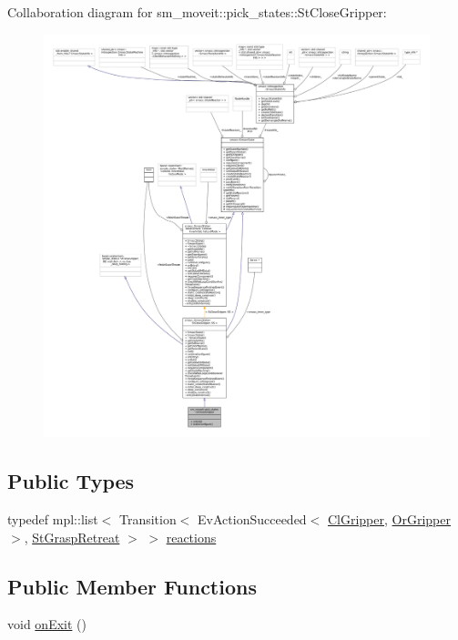 Collaboration diagram for sm\+\_\+moveit\+:\+:pick\+\_\+states\+:\+:St\+Close\+Gripper\+:
\nopagebreak
\begin{figure}[H]
\begin{center}
\leavevmode
\includegraphics[width=350pt]{structsm__moveit_1_1pick__states_1_1StCloseGripper__coll__graph}
\end{center}
\end{figure}
\subsection*{Public Types}
\begin{DoxyCompactItemize}
\item 
typedef mpl\+::list$<$ Transition$<$ Ev\+Action\+Succeeded$<$ \hyperlink{classsm__moveit_1_1cl__gripper_1_1ClGripper}{Cl\+Gripper}, \hyperlink{classsm__moveit_1_1OrGripper}{Or\+Gripper} $>$, \hyperlink{structsm__moveit_1_1pick__states_1_1StGraspRetreat}{St\+Grasp\+Retreat} $>$ $>$ \hyperlink{structsm__moveit_1_1pick__states_1_1StCloseGripper_a2633bb75744ad12db32d6e874d7152fd}{reactions}
\end{DoxyCompactItemize}
\subsection*{Public Member Functions}
\begin{DoxyCompactItemize}
\item 
void \hyperlink{structsm__moveit_1_1pick__states_1_1StCloseGripper_aaa0ec979ec47ffea358d2375c1ed0910}{on\+Exit} ()
\end{DoxyCompactItemize}
